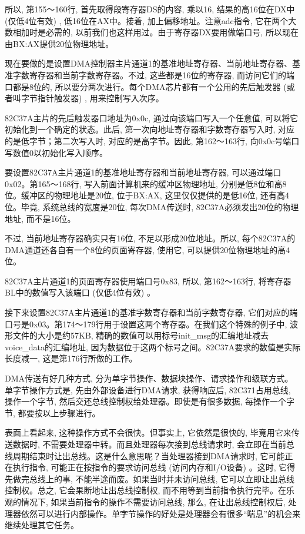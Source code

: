 \documentclass[12pt]{article}
\begin{document}
\begin{CJK}{UTF8}{gbsn}
所以, 第155～160行, 首先取得段寄存器DS的内容, 乘以16, 结果的高16位在DX中 (仅低4位有效) , 低16位在AX中。接着, 加上偏移地址。注意adc指令, 它在两个大数相加时是必需的, 以前我们也这样用过。由于寄存器DX要用做端口号, 所以现在由BX:AX提供20位物理地址。

现在要做的是设置DMA控制器主片通道1的基准地址寄存器、当前地址寄存器、基准字数寄存器和当前字数寄存器。不过, 这些都是16位的寄存器, 而访问它们的端口都是8位的, 所以要分两次进行。每个DMA芯片都有一个公用的先后触发器 (或者叫字节指针触发器) , 用来控制写入次序。

82C37A主片的先后触发器口地址为0x0c, 通过向该端口写入一个任意值, 可以将它初始化到一个确定的状态。此后, 第一次向地址寄存器和字数寄存器写入时, 对应的是低字节；第二次写入时, 对应的是高字节。因此, 第162～163行, 向0x0c号端口写数值0以初始化写入顺序。

要设置82C37A主片通道1的基准地址寄存器和当前地址寄存器, 可以通过端口0x02。第165～168行, 写入前面计算机来的缓冲区物理地址, 分别是低8位和高8位。缓冲区的物理地址是20位, 位于BX:AX, 这里仅仅提供的是低16位, 还有高4位。毕竟, 系统总线的宽度是20位, 每次DMA传送时, 82C37A必须发出20位的物理地址, 而不是16位。

不过, 当前地址寄存器确实只有16位, 不足以形成20位地址。所以, 每个82C37A的DMA通道还各自有一个8位的页面寄存器, 使用它, 可以提供20位物理地址的高4位。

82C37A主片通道1的页面寄存器使用端口号0x83, 所以, 第162～163行, 将寄存器BL中的数值写入该端口 (仅低4位有效) 。

接下来设置82C37A主片通道1的基准字数寄存器和当前字数寄存器, 它们对应的端口号是0x03。第174～179行用于设置这两个寄存器。在我们这个特殊的例子中, 波形文件的大小是约57KB, 精确的数值可以用标号init\_{}msg的汇编地址减去voice\_{}data的汇编地址, 因为数据位于这两个标号之间。82C37A要求的数值是实际长度减一, 这是第176行所做的工作。

DMA传送有好几种方式, 分为单字节操作、数据块操作、请求操作和级联方式。单字节操作方式是, 先由外部设备进行DMA请求, 获得响应后, 82C371占用总线, 操作一个字节, 然后交还总线控制权给处理器。即使是有很多数据, 每操作一个字节, 都要按以上步骤进行。

表面上看起来, 这种操作方式不会很快。但事实上, 它依然是很快的, 毕竟用它来传送数据时, 不需要处理器中转。而且处理器每次接到总线请求时, 会立即在当前总线周期结束时让出总线。这是什么意思呢？当处理器接到DMA请求时, 它可能正在执行指令, 可能正在按指令的要求访问总线 (访问内存和I/O设备) 。这时, 它得先做完总线上的事, 不能半途而废。如果当时并未访问总线, 它可以立即让出总线控制权。总之, 它会果断地让出总线控制权, 而不用等到当前指令执行完毕。在乐观的情况下, 如果当前指令的操作不需要访问总线, 那么, 在让出总线控制权后, 处理器依然可以进行内部操作。单字节操作的好处是处理器会有很多“喘息”的机会来继续处理其它任务。


\end{CJK}
\end{document}
